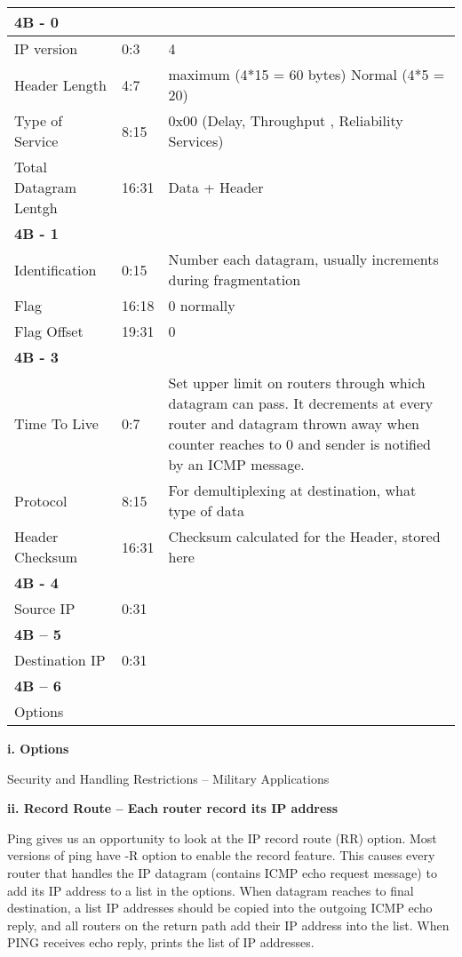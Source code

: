 \documentclass[letterpaper,10pt,english]{sphinxmanual}
\begin{document}
\begin{tabulary}{\linewidth}{|L|L|L|}
\hline

\textbf{4B - 0}
 &  & \\
\hline
IP version
 & 
0:3
 & 
4
\\
\hline
Header Length
 & 
4:7
 & 
maximum (4*15 = 60 bytes)       Normal  (4*5 = 20)
\\
\hline
Type of Service
 & 
8:15
 & 
0x00 (Delay, Throughput , Reliability Services)
\\
\hline
Total Datagram Lentgh
 & 
16:31
 & 
Data + Header
\\
\hline
\textbf{4B - 1}
 &  & \\
\hline
Identification
 & 
0:15
 & 
Number each datagram, usually increments during fragmentation
\\
\hline
Flag
 & 
16:18
 & 
0 normally
\\
\hline
Flag Offset
 & 
19:31
 & 
0
\\
\hline
\textbf{4B - 3}
 &  & \\
\hline
Time To Live
 & 
0:7
 & 
Set upper limit on routers through which datagram can pass. It decrements at every router and datagram thrown away                                                        when counter reaches to 0 and sender is notified by an ICMP message.
\\
\hline
Protocol
 & 
8:15
 & 
For demultiplexing at destination, what type of data
\\
\hline
Header Checksum
 & 
16:31
 & 
Checksum calculated for the Header, stored here
\\
\hline
\textbf{4B - 4}
 &  & \\
\hline
Source IP
 & 
0:31
 & \\
\hline
\textbf{4B – 5}
 &  & \\
\hline
Destination IP
 & 
0:31
 & \\
\hline
\textbf{4B – 6}
 &  & \\
\hline
Options
 &  & \\
\hline\end{tabulary}


\textbf{i. Options}

Security and Handling  Restrictions – Military Applications

\textbf{ii. Record Route – Each router record its IP address}

Ping gives us an opportunity to look at the IP record route (RR) option. Most versions of ping have -R option to enable the record feature. This causes every router that handles the IP datagram (contains ICMP echo request message) to add its IP address to a list in the options. When datagram reaches to final destination, a list IP addresses should be copied into the outgoing ICMP echo reply, and all routers on the return path add their IP address into the list. When PING receives echo reply, prints the list of IP addresses.
\end{document}
